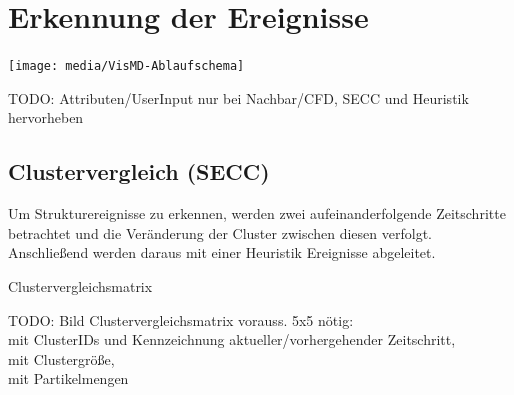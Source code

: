 \documentclass[10pt]{beamer}
\begin{document}
\section{Erkennung der Ereignisse}
\begin{frame}
	\texttt{[image: media/VisMD-Ablaufschema]}
	
	TODO: Attributen/UserInput nur bei Nachbar/CFD, SECC und Heuristik hervorheben
\end{frame}

\subsection{Clustervergleich (SECC)}

\begin{frame}
	Um Strukturereignisse zu erkennen, werden zwei aufeinanderfolgende Zeitschritte betrachtet und die Veränderung der Cluster zwischen diesen verfolgt. Anschließend werden daraus mit einer Heuristik Ereignisse abgeleitet.
\end{frame}

\begin{frame}{Clustervergleichsmatrix}

	TODO: Bild Clustervergleichsmatrix vorauss. 5x5 nötig:\\
	mit ClusterIDs und Kennzeichnung aktueller/vorhergehender Zeitschritt,\\
	mit Clustergröße,\\
	mit Partikelmengen

\end{frame}
\end{document}
